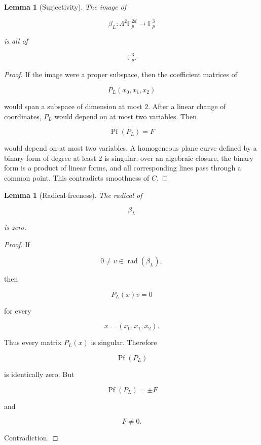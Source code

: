 \documentclass[11pt]{article}
\newtheorem{lemma}[theorem]{Lemma}
\begin{document}
\begin{lemma}[Surjectivity]
The image of

\[
\beta_L:\Lambda^2\mathbb F_p^{2d}\to\mathbb F_p^3
\]

is all of

\[
\mathbb F_p^3.
\]

\end{lemma}

\begin{proof}
If the image were a proper subspace, then the coefficient matrices of

\[
P_L(x_0,x_1,x_2)
\]

would span a subspace of dimension at most $2$. After a linear change of coordinates, $P_L$ would depend on at most two variables. Then

\[
\operatorname{Pf}(P_L)=F
\]

would depend on at most two variables. A homogeneous plane curve defined by a binary form of degree at least $2$ is singular: over an algebraic closure, the binary form is a product of linear forms, and all corresponding lines pass through a common point. This contradicts smoothness of $C$.

\end{proof}

\begin{lemma}[Radical-freeness]
The radical of

\[
\beta_L
\]

is zero.

\end{lemma}

\begin{proof}
If

\[
0\neq v\in\operatorname{rad}(\beta_L),
\]

then

\[
P_L(x)v=0
\]

for every

\[
x=(x_0,x_1,x_2).
\]

Thus every matrix $P_L(x)$ is singular. Therefore

\[
\operatorname{Pf}(P_L)
\]

is identically zero. But

\[
\operatorname{Pf}(P_L)=\pm F
\]

and

\[
F\neq0.
\]

Contradiction.

\end{proof}
\end{document}
